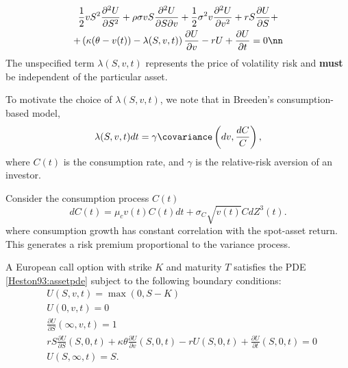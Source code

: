     \begin{frame}
            \begin{multline}
                \frac{1}{2}vS^2\frac{\partial^2 U}{\partial S^2} + \rho\sigma v S \frac{\partial^2 U}{\partial S \partial v} + \frac{1}{2}\sigma^2 v \frac{\partial^2 U}{\partial v^2} + 
                rS\frac{\partial U}{\partial S} +\\+ \left(\kappa(\theta - v(t)) - \lambda(S, v, t)\right)\frac{\partial U}{\partial v}
                - rU + \frac{\partial U}{\partial t} = 0 \nn
            \end{multline}
            The unspecified term $\lambda(S, v, t)$ represents the price of volatility risk and \textbf{must} be independent of the particular asset.        
        
            To motivate the choice of $\lambda(S, v, t)$, we note that in Breeden's consumption-based model,
            \begin{equation}
                \lambda(S, v, t)dt = \gamma \covariance \left(dv, \frac{dC}{C}\right),
            \end{equation}
            where $C(t)$ is the consumption rate, and $\gamma$ is the relative-risk aversion of an investor. 
    \end{frame}

    \begin{frame}
            Consider the consumption process $C(t)$
            \begin{equation}
                dC(t) = \mu_c v(t) C(t) dt + \sigma_C \sqrt{v(t)} CdZ^3(t).
            \end{equation}
            where consumption growth has constant correlation with the spot-asset return.
            This generates a risk premium proportional to the variance process. 
    \end{frame}

    \begin{frame}
        A European  call  option  with  strike   $K$  and  maturity $T$
        satisfies  the  PDE  \eqref{Heston93:assetpde}  subject  to  the  following  boundary  conditions:
        \begin{align}
            & U(S, v, t) = \max \left(0, S-K\right) \\
            & U(0, v, t) = 0 \\
            & \frac{\partial U}{\partial S}(\infty, v, t) = 1 \\
            & rS \frac{\partial U}{\partial S}(S, 0, t) + \kappa \theta\frac{\partial U}{\partial v}(S, 0, t) - r U(S, 0, t) +\frac{\partial U}{\partial t}(S, 0, t) = 0 \\
            & U(S, \infty, t) = S.
        \end{align}
    \end{frame}

